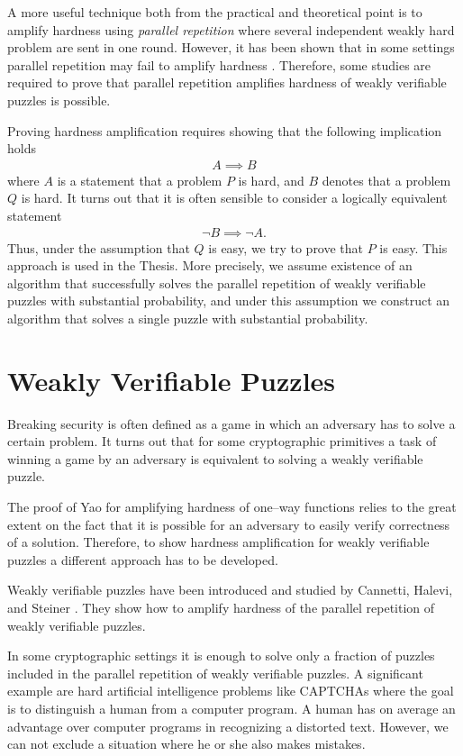 \documentclass[11pt,a4paper,titlepage]{memoir}
\begin{document}
A more useful technique both from the practical and theoretical point is to amplify hardness using \textit{parallel repetition}
where several independent weakly hard problem are sent in one round.
However, it has been shown that in some settings parallel repetition may fail to amplify hardness \cite{bellare1997does}.
Therefore, some studies are required to prove that parallel repetition amplifies hardness
of weakly verifiable puzzles is possible.

Proving hardness amplification requires showing that the following implication holds
\begin{align*}
  A \implies B
\end{align*}
where $A$ is a statement that a problem $P$ is hard, and $B$ denotes that a problem $Q$ is hard.
It turns out that it is often sensible to consider a logically equivalent statement
\begin{align*}
  \lnot B \implies \lnot A.
\end{align*}
Thus, under the assumption that $Q$ is easy, we try to prove that $P$ is easy.
This approach is used in the Thesis. More precisely, we assume existence of an algorithm that successfully
solves the parallel repetition of weakly verifiable puzzles with substantial probability, and
under this assumption we construct an algorithm that solves a single puzzle with substantial probability.

\section{Weakly Verifiable Puzzles}
Breaking security is often defined as a game in which an adversary has to solve a certain problem.
It turns out that for some cryptographic primitives a task of winning a game by an adversary
is equivalent to solving a weakly verifiable puzzle.

The proof of Yao for amplifying hardness of one--way functions relies to the great extent on the fact that it is possible
for an adversary to easily verify correctness of a solution. Therefore, to show hardness amplification
for weakly verifiable puzzles a different approach has to be developed.

Weakly verifiable puzzles have been introduced and studied by Cannetti, Halevi, and Steiner \cite{canetti2004hardness}.
They show how to amplify hardness of the parallel repetition of weakly verifiable puzzles.

In some cryptographic settings it is enough to solve only a fraction of puzzles included in the parallel repetition of weakly verifiable puzzles.
A significant example are hard artificial intelligence problems like CAPTCHAs where the goal is to distinguish a human from a computer program.
A human has on average an advantage over computer programs in recognizing a distorted text. However, we can not exclude a situation where he or she also makes mistakes.
\end{document}
